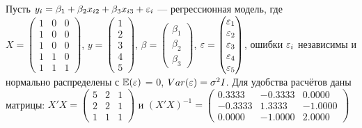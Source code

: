 \begin{problem}
Пусть $y_i = \beta_1 + \beta_2 x_{i2} + \beta_3 x_{i3} + \varepsilon_i$ --- регрессионная модель, где $X = \begin{pmatrix} 1 & 0 & 0 \\ 1 & 0 & 0 \\ 1 & 0 & 0 \\ 1 & 1 & 0 \\ 1 & 1 & 1 \end{pmatrix}$, $y = \begin{pmatrix} 1 \\ 2 \\ 3 \\ 4 \\ 5 \end{pmatrix}$, $\beta = \begin{pmatrix} \beta_1 \\ \beta_2 \\ \beta_3 \end{pmatrix}$, $\varepsilon = \begin{pmatrix} \varepsilon_1 \\ \varepsilon_2 \\ \varepsilon_3 \\ \varepsilon_4 \\ \varepsilon_5  \end{pmatrix}$, ошибки $\varepsilon_i$ независимы и нормально распределены с $\mathbb{E}(\varepsilon)$ = 0, $Var(\varepsilon) = \sigma^2 I$. Для удобства расчётов даны матрицы: $X'X = \begin{pmatrix} 5 & 2 & 1 \\ 2 & 2 & 1\\ 1 & 1 & 1 \end{pmatrix}$ и $(X'X)^{-1}= \begin{pmatrix} 0.3333 & -0.3333 & 0.0000 \\ -0.3333 & 1.3333 & -1.0000 \\ 0.0000 & -1.0000 & 2.0000 \end{pmatrix}$






\end{problem}
